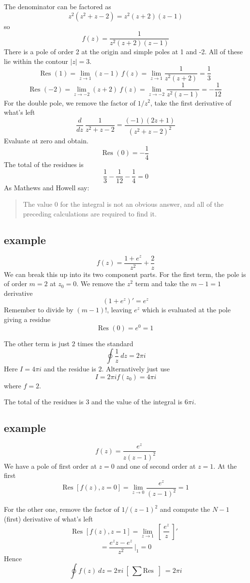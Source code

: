 \documentclass[11pt, oneside]{article}
\begin{document}
The denominator can be factored as
\[ z^2(z^2 + z - 2) = z^2(z + 2)(z - 1) \]
so
\[ f(z) = \frac{1}{z^2(z + 2)(z - 1)} \]
There is a pole of order 2 at the origin and simple poles at 1 and -2.  All of these lie within the contour $|z| = 3$.
\[ \text{Res }(1) = \lim_{z \rightarrow 1} (z-1) \ f(z) = \lim_{z \rightarrow 1} \frac{1}{z^2 (z + 2)} = \frac{1}{3} \]
\[ \text{Res }(-2) = \lim_{z \rightarrow -2} (z+2) \ f(z) = \lim_{z \rightarrow -2} \frac{1}{z^2 (z - 1)} = -\frac{1}{12} \]
For the double pole, we remove the factor of $1/z^2$, take the first derivative of what's left
\[ \frac{d}{dz} \ \frac{1}{z^2 + z - 2} = \frac{(-1)(2z + 1)}{(z^2 + z - 2)^2} \]
Evaluate at zero and obtain.
\[ \text{Res }(0) = - \frac{1}{4} \]
The total of the residues is
\[ \frac{1}{3} -\frac{1}{12} - \frac{1}{4} = 0 \]
As Mathews and Howell say:
\begin{quote}The value 0 for the integral is not an obvious answer, and all of the preceding calculations are required to find it.\end{quote}

\subsection*{example}
\[ f(z) = \frac{1 + e^z}{z^2} + \frac{2}{z} \]
We can break this up into its two component parts.  For the first term, the pole is of order $m = 2$ at $z_0 = 0$.  We remove the $z^2$ term and take the $m-1 = 1$ derivative
\[ (1 + e^z)' = e^z \]
Remember to divide by $(m-1)!$, leaving $e^z$ which is evaluated at the pole giving a residue
\[ \text{Res }(0) = e^0 = 1 \]

The other term is just $2$ times the standard
\[ \oint \frac{1}{z} \ dz = 2 \pi i \]
Here $I = 4 \pi i$ and the residue is $2$.  Alternatively just use
\[ I = 2 \pi i f(z_0) = 4 \pi i \]
where $f = 2$.

The total of the residues is $3$ and the value of the integral is $6 \pi i$.



\subsection*{example}
\[ f(z) = \frac{e^z}{z(z-1)^2} \]
We have a pole of first order at $z=0$ and one of second order at $z=1$.  At the first
\[ \text{Res } [f(z),z=0] = \lim_{z \rightarrow 0} \frac{e^z}{(z-1)^2} = 1 \]

For the other one, remove the factor of $1/(z-1)^2$ and compute the $N-1$ (first) derivative of what's left
\[ \text{Res } [f(z),z=1] = \lim_{z \rightarrow 1} \ [ \ \frac{e^z}{z} \ ]' \ \]
\[ = \frac{e^z z - e^z}{z^2} \ \bigg |_1 =  0 \]
Hence
\[ \oint f(z) \ dz = 2 \pi i \ [ \ \sum  \text{Res } \ ] \ = 2 \pi i \]
\end{document}
